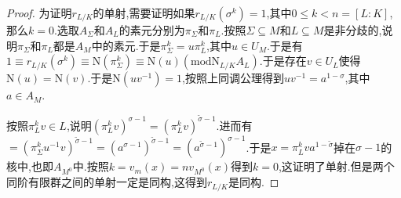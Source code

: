 \begin{enumerate}
\begin{proof}
    	为证明$r_{L/K}$的单射,需要证明如果$r_{L/K}(\sigma^k)=1$,其中$0\le k<n=[L:K]$,那么$k=0$.选取$A_{\Sigma}$和$A_L$的素元分别为$\pi_{\Sigma}$和$\pi_L$.按照$\Sigma\subseteq M$和$L\subseteq M$是非分歧的,说明$\pi_{\Sigma}$和$\pi_L$都是$A_M$中的素元.于是$\pi_{\Sigma}^k=u\pi_L^k$,其中$u\in U_M$.于是有$1\equiv r_{L/K}(\sigma^k)\equiv\mathrm{N}(\pi_{\Sigma}^k)\equiv\mathrm{N}(u)(\mathrm{mod}\mathrm{N}_{L/K}A_L)$.于是存在$v\in U_L$使得$\mathrm{N}(u)=\mathrm{N}(v)$.于是$\mathrm{N}(uv^{-1})=1$,按照上同调公理得到$uv^{-1}=a^{1-\sigma}$,其中$a\in A_M$.
    	
    	按照$\pi_L^kv\in L$,说明$(\pi_L^kv)^{\sigma-1}=(\pi_L^kv)^{\widetilde{\sigma}-1}$.进而有$=(\pi_{\Sigma}^ku^{-1}v)^{\widetilde{\sigma}-1}=(a^{\sigma-1})^{\widetilde{\sigma}-1}=(a^{\widetilde{\sigma}-1})^{\sigma-1}$.于是$x=\pi_L^kva^{1-\widetilde{\sigma}}$掉在$\sigma-1$的核中,也即$A_{M^0}$中.按照$k=v_m(x)=nv_{M^0}(x)$得到$k=0$,这证明了单射.但是两个同阶有限群之间的单射一定是同构,这得到$r_{L/K}$是同构.
    \end{proof}
\end{enumerate}

